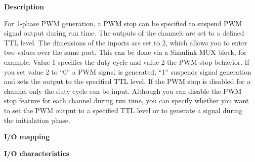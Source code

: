 \noindent \textbf{Description}\par 
For 1-phase PWM generation, a PWM stop can be specified to suspend PWM signal output during run time. The outputs of the channels are set to a defined TTL level. The dimensions of the inports are set to 2, which allows you to enter two values over the same port. This can be done via a Simulink MUX block, for example. Value 1 specifies the duty cycle and value 2 the PWM stop behavior. If you set value 2 to “0” a PWM signal is generated, “1” suspends signal generation and sets the output to the specified TTL level. If the PWM stop is disabled for a channel only the duty cycle can be input. Although you can disable the PWM stop feature for each channel during run time, you can specify whether you want to set the PWM output to a specified TTL level or to generate a signal during the initialation phase.

\noindent \textbf{I/O mapping}\par 



\noindent \textbf{I/O characteristics}\par



